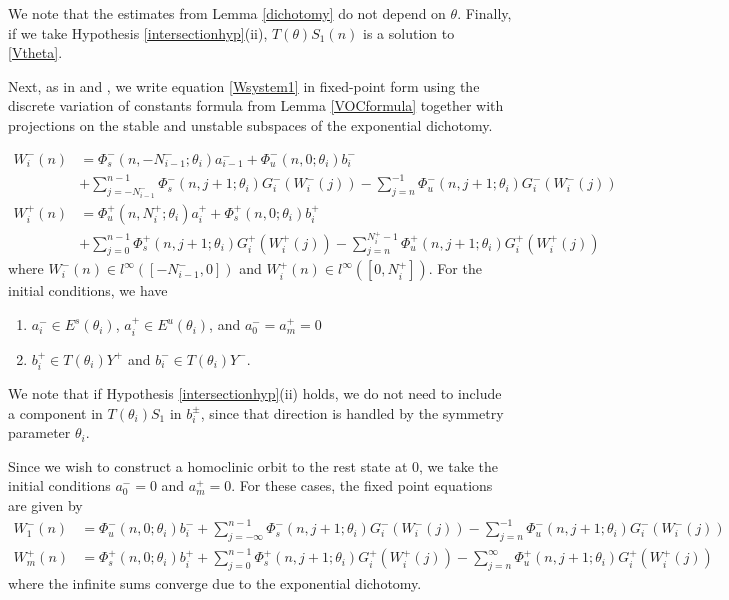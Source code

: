 \documentclass[12pt]{article}
\begin{document}
We note that the estimates from Lemma \ref{dichotomy} do not depend on $\theta$. Finally, if we take Hypothesis \ref{intersectionhyp}(ii), $T(\theta) S_1(n)$ is a solution to \eqref{Vtheta}.

Next, as in \cite{Sandstede1997} and \cite{Knobloch2000}, we write equation \eqref{Wsystem1} in fixed-point form using the discrete variation of constants formula from Lemma \ref{VOCformula} together with projections on the stable and unstable subspaces of the exponential dichotomy.

\begin{equation}\label{FPeqs1}
\begin{aligned}
W_i^-(n) &= 
\Phi_s^-(n, -N_{i-1}^-; \theta_i) a_{i-1}^- + \Phi_u^-(n, 0; \theta_i) b_i^-  \\
&+ \sum_{j = -N_{i-1}^-}^{n-1} \Phi_s^-(n, j+1; \theta_i) G_i^-(W_i^-(j)) - \sum_{j = n}^{-1} \Phi_u^-(n, j+1; \theta_i) G_i^-(W_i^-(j)) \\
W_i^+(n) &= \Phi_u^+(n, N_i^+; \theta_i) a_i^+ + \Phi_s^+(n, 0; \theta_i) b_i^+ \\
&+ \sum_{j = 0}^{n-1} \Phi_s^+(n, j+1; \theta_i) G_i^+(W_i^+(j)) 
- \sum_{j = n}^{N_i^+-1} \Phi_u^+(n, j+1; \theta_i) G_i^+(W_i^+(j))
\end{aligned}
\end{equation}
where $W_i^-(n) \in l^\infty([-N_{i-1}^-, 0])$ and $W_i^+(n) \in l^\infty([0, N_i^+])$. For the initial conditions, we have
\begin{enumerate}
\item $a_i^- \in E^s(\theta_i)$, $a_i^+ \in E^u(\theta_i)$, and $a_0^- = a_m^+ = 0$
\item $b_i^+ \in T(\theta_i) Y^+$ and $b_i^- \in T(\theta_i) Y^-$.
\end{enumerate}
We note that if Hypothesis \ref{intersectionhyp}(ii) holds, we do not need to include a component in $T(\theta_i) S_1$ in $b_i^\pm$, since that direction is handled by the symmetry parameter $\theta_i$.

Since we wish to construct a homoclinic orbit to the rest state at 0, we take the initial conditions $a_0^- = 0$ and $a_m^+ = 0$. For these cases, the fixed point equations are given by
\begin{align*}
W_1^-(n) &= \Phi_u^-(n, 0; \theta_i) b_i^- 
+ \sum_{j = -\infty}^{n-1} \Phi_s^-(n, j+1; \theta_i) G_i^-(W_i^-(j)) - \sum_{j = n}^{-1} \Phi_u^-(n, j+1; \theta_i) G_i^-(W_i^-(j)) \\
W_m^+(n) &= \Phi_s^+(n, 0; \theta_i) b_i^+ 
+ \sum_{j = 0}^{n-1} \Phi_s^+(n, j+1; \theta_i) G_i^+(W_i^+(j)) 
- \sum_{j = n}^\infty \Phi_u^+(n, j+1; \theta_i) G_i^+(W_i^+(j))
\end{align*}
where the infinite sums converge due to the exponential dichotomy. 
\end{document}
